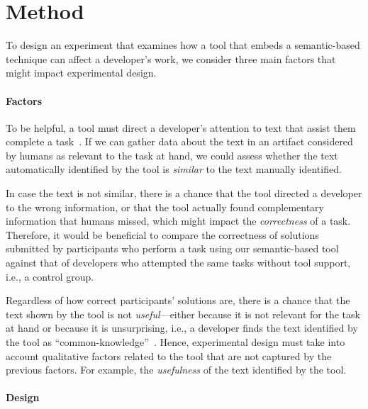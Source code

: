 


\section{Method}
\label{cp6:method}


To design an experiment
that examines how a tool that embeds a semantic-based technique can affect a developer's work,
we consider three main factors that might impact experimental design.




\paragraph{\textbf{Factors}}



To be helpful, a tool must direct a developer's attention to text that assist them complete a task~\cite{Robillard2015}. If we can gather data about the text in an artifact considered by humans as relevant to the task at hand, we could assess whether the text automatically identified by the tool is \textit{similar} to the text manually identified. 


In case the text is not similar,
there is a chance that the tool directed a developer to the wrong information, or that 
the tool actually found complementary information that humans missed, which might impact the \textit{correctness} of a task. Therefore, it would be beneficial to compare the correctness of solutions submitted by participants who perform a task using our semantic-based tool against that of developers who attempted the same tasks without tool support, i.e., a control group.


Regardless of how correct participants' solutions are, there is a chance that the text shown by the tool is not \textit{useful}---either because it is not relevant for the task at hand or because it is unsurprising, i.e., 
a developer finds the text identified by the tool as ``common-knowledge''~\cite{cwalina2008, Robillard2015}. Hence, experimental design must take into account qualitative factors 
related to the tool that are not captured by the previous factors. For example, the \textit{usefulness} of the text identified by the tool. 




\paragraph{\textbf{Design}}




